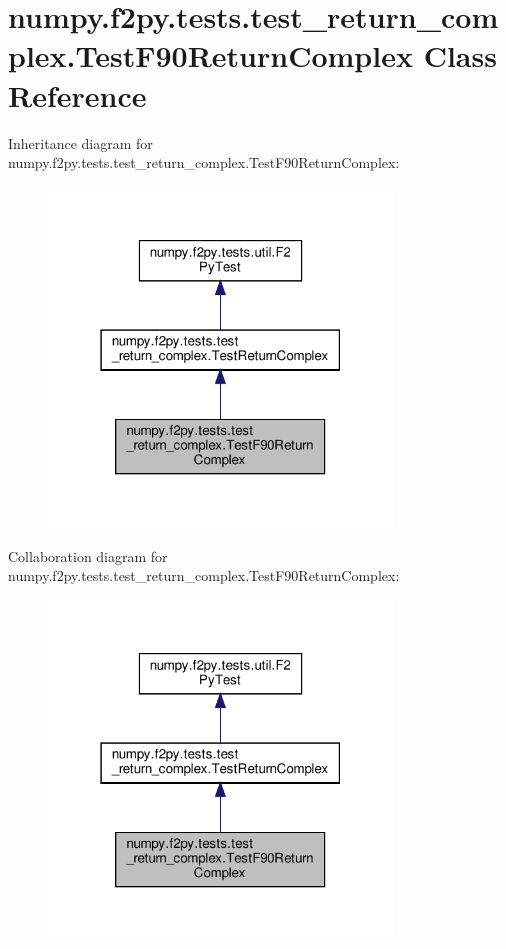 \hypertarget{classnumpy_1_1f2py_1_1tests_1_1test__return__complex_1_1TestF90ReturnComplex}{}\section{numpy.\+f2py.\+tests.\+test\+\_\+return\+\_\+complex.\+Test\+F90\+Return\+Complex Class Reference}
\label{classnumpy_1_1f2py_1_1tests_1_1test__return__complex_1_1TestF90ReturnComplex}


Inheritance diagram for numpy.\+f2py.\+tests.\+test\+\_\+return\+\_\+complex.\+Test\+F90\+Return\+Complex\+:
\nopagebreak
\begin{figure}[H]
\begin{center}
\leavevmode
\includegraphics[width=259pt]{classnumpy_1_1f2py_1_1tests_1_1test__return__complex_1_1TestF90ReturnComplex__inherit__graph}
\end{center}
\end{figure}


Collaboration diagram for numpy.\+f2py.\+tests.\+test\+\_\+return\+\_\+complex.\+Test\+F90\+Return\+Complex\+:
\nopagebreak
\begin{figure}[H]
\begin{center}
\leavevmode
\includegraphics[width=259pt]{classnumpy_1_1f2py_1_1tests_1_1test__return__complex_1_1TestF90ReturnComplex__coll__graph}
\end{center}
\end{figure}
